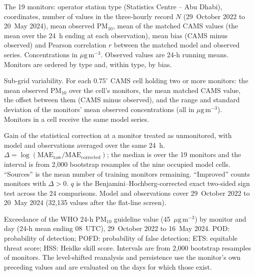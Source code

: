 \documentclass[preprint,review,12pt,number,sort&compress]{elsarticle}
\newcommand*{\ugm}{\ensuremath{\mu\mathrm{g\,m^{-3}}}}
\newcommand*{\pmten}{\ensuremath{\mathrm{PM_{10}}}}
\begin{document}
\clearpage

\begin{table}[p]\centering\footnotesize
\caption{The 19 monitors: operator station type (Statistics Centre -- Abu Dhabi), coordinates, number of
values in the three-hourly record $N$ (29~October 2022 to 20~May 2024), mean observed \pmten{},
mean of the matched CAMS values (the mean over the 24~h ending at each observation), mean bias
(CAMS minus observed) and Pearson correlation $r$ between the matched model and observed series.
Concentrations in \ugm{}. Observed values are 24-h running means. Monitors are ordered by type
and, within type, by bias.}
\label{tab:stations}
\resizebox{\textwidth}{!}{}
\end{table}

\begin{table}[p]\centering\footnotesize
\caption{Sub-grid variability. For each $0.75^{\circ}$ CAMS cell holding two or more monitors:
the mean observed \pmten{} over the cell's monitors, the mean matched CAMS value, the offset
between them (CAMS minus observed), and the range and
standard deviation of the monitors' mean observed concentrations (all in \ugm{}). Monitors in a
cell receive the same model series.}
\label{tab:cells}
\resizebox{\textwidth}{!}{}
\end{table}

\begin{table}\centering\footnotesize
\caption{Gain of the statistical correction at a monitor treated as unmonitored, with model and
observations averaged over the same 24~h.
$\Delta=\log(\mathrm{MAE_{raw}}/\mathrm{MAE_{corrected}})$; the median is over the 19 monitors and
the interval is from 2,000 bootstrap resamples of the nine occupied model cells. ``Sources'' is
the mean number of training monitors remaining. ``Improved'' counts monitors with $\Delta>0$.
$q$ is the Benjamini--Hochberg-corrected exact two-sided sign test across the 24 comparisons.
Model and observations cover 29~October 2022 to 20~May 2024 (32,135 values after the flat-line
screen).}
\label{tab:transfer}
\resizebox{\textheight}{!}{}
\end{table}

\begin{table}[p]\centering\footnotesize
\caption{Exceedance of the WHO 24-h \pmten{} guideline value (45~\ugm{}) by monitor and day (24-h
mean ending 08~UTC), 29~October 2022 to 16~May 2024. POD: probability of detection; POFD: probability of
false detection; ETS: equitable threat score; HSS: Heidke skill score. Intervals are from 2,000
bootstrap resamples of monitors. The level-shifted reanalysis and persistence use the monitor's
own preceding values and are evaluated on the days for which those exist.}
\label{tab:exceed}
\resizebox{\textwidth}{!}{}
\end{table}
\end{document}
